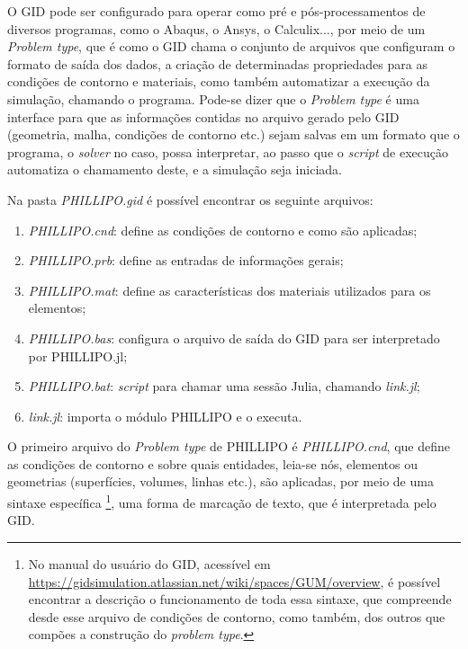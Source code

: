 O GID pode ser configurado para operar como pré e pós-processamentos de diversos programas, como o Abaqus, o Ansys, o Calculix..., por meio de um \emph{Problem type}, que é como o GID chama o conjunto de arquivos que configuram o formato de saída dos dados, a criação de determinadas propriedades para as condições de contorno e materiais, como também automatizar a execução da simulação, chamando o programa. Pode-se dizer que o \emph{Problem type} é uma interface para que as informações contidas no arquivo gerado pelo GID (geometria, malha, condições de contorno etc.) sejam salvas em um formato que o programa, o \emph{solver} no caso, possa interpretar, ao passo que o \emph{script} de execução automatiza o chamamento deste, e a simulação seja iniciada. 

Na pasta \emph{PHILLIPO.gid} é possível encontrar os seguinte arquivos:

\begin{enumerate}
    \item \emph{PHILLIPO.cnd}: define as condições de contorno e como são aplicadas;
    \item \emph{PHILLIPO.prb}: define as entradas de informações gerais;
    \item \emph{PHILLIPO.mat}: define as características dos materiais utilizados para os elementos;
    \item \emph{PHILLIPO.bas}: configura o arquivo de saída do GID para ser interpretado por PHILLIPO.jl;
    \item \emph{PHILLIPO.bat}: \emph{script} para chamar uma sessão Julia, chamando \emph{link.jl};
    \item \emph{link.jl}: importa o módulo PHILLIPO e o executa.
\end{enumerate}

O primeiro arquivo do \emph{Problem type} de PHILLIPO é \emph{PHILLIPO.cnd}, que define as condições de contorno e sobre quais entidades, leia-se nós, elementos ou geometrias (superfícies, volumes, linhas etc.), são aplicadas, por meio de uma sintaxe específica \footnote{No manual do usuário do GID, acessível em \url{https://gidsimulation.atlassian.net/wiki/spaces/GUM/overview}, é possível encontrar a descrição o funcionamento de toda essa sintaxe, que compreende desde esse arquivo de condições de contorno, como também, dos outros que compões a construção do \emph{problem type}.}, uma forma de marcação de texto, que é interpretada pelo GID.


